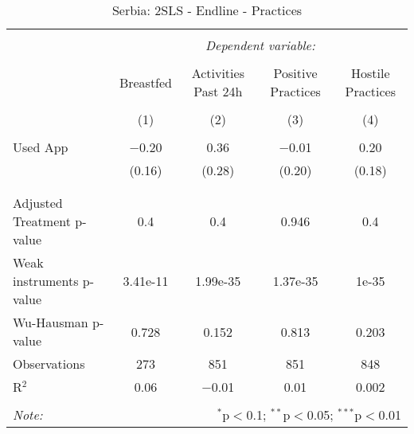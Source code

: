 
\begin{table}[!htbp] \centering 
  \caption{Serbia: 2SLS - Endline - Practices} 
  \label{tbl:Serbia: 2SLS - Endline - Practices} 
\begin{tabular}{@{\extracolsep{5pt}}lcccc} 
\\[-1.8ex]\hline 
\hline \\[-1.8ex] 
 & \multicolumn{4}{c}{\textit{Dependent variable:}} \\ 
\cline{2-5} 
\\[-1.8ex] & Breastfed & Activities Past 24h & Positive Practices & Hostile Practices \\ 
\\[-1.8ex] & (1) & (2) & (3) & (4)\\ 
\hline \\[-1.8ex] 
 Used App & $-$0.20 & 0.36 & $-$0.01 & 0.20 \\ 
  & (0.16) & (0.28) & (0.20) & (0.18) \\ 
  & & & & \\ 
\hline \\[-1.8ex] 
Adjusted Treatment p-value & 0.4 & 0.4 & 0.946 & 0.4 \\ 
Weak instruments p-value & 3.41e-11 & 1.99e-35 & 1.37e-35 & 1e-35 \\ 
Wu-Hausman p-value & 0.728 & 0.152 & 0.813 & 0.203 \\ 
Observations & 273 & 851 & 851 & 848 \\ 
R$^{2}$ & 0.06 & $-$0.01 & 0.01 & 0.002 \\ 
\hline 
\hline \\[-1.8ex] 
\textit{Note:}  & \multicolumn{4}{r}{$^{*}$p$<$0.1; $^{**}$p$<$0.05; $^{***}$p$<$0.01} \\ 
\end{tabular} 
\end{table} 
